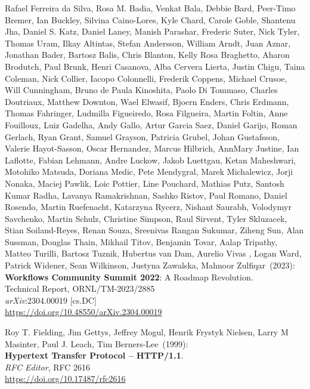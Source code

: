 \begin{thebibliography}{9}
Rafael Ferreira da Silva, Rosa M. Badia, Venkat Bala, Debbie Bard, Peer-Timo Bremer, Ian Buckley, Silvina Caino-Lores, Kyle Chard, Carole Goble, Shantenu Jha, Daniel S. Katz, Daniel Laney, Manish Parashar, Frederic Suter, Nick Tyler, Thomas Uram, Ilkay Altintas, Stefan Andersson, William Arndt, Juan Aznar, Jonathan Bader, Bartosz Balis, Chris Blanton, Kelly Rosa Braghetto, Aharon Brodutch, Paul Brunk, Henri Casanova, Alba Cervera Lierta, Justin Chigu, Taina Coleman, Nick Collier, Iacopo Colonnelli, Frederik Coppens, Michael Crusoe, Will Cunningham, Bruno de Paula Kinoshita, Paolo Di Tommaso, Charles Doutriaux, Matthew Downton, Wael Elwasif, Bjoern Enders, Chris Erdmann, Thomas Fahringer, Ludmilla Figueiredo, Rosa Filgueira, Martin Foltin, Anne Fouilloux, Luiz Gadelha, Andy Gallo, Artur Garcia Saez, Daniel Garijo, Roman Gerlach, Ryan Grant, Samuel Grayson, Patricia Grubel, Johan Gustafsson, Valerie Hayot-Sasson, Oscar Hernandez, Marcus Hilbrich, AnnMary Justine, Ian Laflotte, Fabian Lehmann, Andre Luckow, Jakob Luettgau, Ketan Maheshwari, Motohiko Matsuda, Doriana Medic, Pete Mendygral, Marek Michalewicz, Jorji Nonaka, Maciej Pawlik, Loic Pottier, Line Pouchard, Mathias Putz, Santosh Kumar Radha, Lavanya Ramakrishnan, Sashko Ristov, Paul Romano, Daniel Rosendo, Martin Ruefenacht, Katarzyna Rycerz, Nishant Saurabh, Volodymyr Savchenko, Martin Schulz, Christine Simpson, Raul Sirvent, Tyler Skluzacek, Stian Soiland-Reyes, Renan Souza, Sreenivas Rangan Sukumar, Ziheng Sun, Alan Sussman, Douglas Thain, Mikhail Titov, Benjamin Tovar, Aalap Tripathy, Matteo Turilli, Bartosz Tuznik, Hubertus van Dam, Aurelio Vivas , Logan Ward, Patrick Widener, Sean Wilkinson, Justyna Zawalska, Mahnoor Zulfiqar~(2023): \\
\textbf{Workflows Community Summit 2022}: A Roadmap Revolution.\\
Technical Report, ORNL/TM-2023/2885 \\
\emph{arXiv}:2304.00019 [cs.DC] \\
\url{https://doi.org/10.48550/arXiv.2304.00019}

Roy T. Fielding, Jim Gettys, Jeffrey Mogul, Henrik Frystyk Nielsen, Larry M Masinter, Paul J. Leach, Tim Berners-Lee~(1999): \\
\textbf{Hypertext Transfer Protocol -- HTTP/1.1}.\\
\emph{RFC Editor}, RFC 2616\\
\url{https://doi.org/10.17487/rfc2616}


\end{thebibliography}

